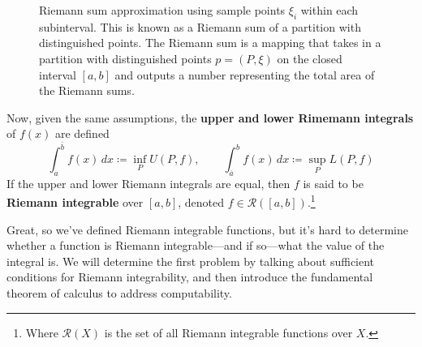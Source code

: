 \begin{definition}
\begin{figure}[H]
      \caption{Riemann sum approximation using sample points $\xi_i$ within each subinterval. This is known as a Riemann sum of a partition with distinguished points. The Riemann sum is a mapping that takes in a partition with distinguished points $p = (P, \xi)$ on the closed interval $[a, b]$ and outputs a number representing the total area of the Riemann sums. }
      \label{fig:riemann-sum-xi}
    \end{figure}
  \end{definition}

  \begin{definition}
    Now, given the same assumptions, the \textbf{upper and lower Rimemann integrals} of $f(x)$ are defined 
    \begin{equation}
      \int_a^{\bar{b}} f(x) \, dx \coloneqq \inf_P U(P, f), \qquad \int_{\bar{a}}^{b} f(x) \, dx \coloneqq \sup_P L(P, f)
    \end{equation}
    If the upper and lower Riemann integrals are equal, then $f$ is said to be \textbf{Riemann integrable} over $[a, b]$, denoted $f \in \mathcal{R}([a, b])$.\footnote{Where $\mathcal{R}(X)$ is the set of all Riemann integrable functions over $X$.}
  \end{definition} 

  Great, so we've defined Riemann integrable functions, but it's hard to determine whether a function is Riemann integrable---and if so---what the value of the integral is. We will determine the first problem by talking about sufficient conditions for Riemann integrability, and then introduce the fundamental theorem of calculus to address computability. 

